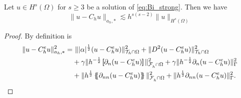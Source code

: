 \begin{lemma}
    \label{lemma:astar_estimate}
    Let $u \in H^{s}( \Omega ) $ for $s\ge 3$ be a solution of \eqref{eq:Bi_strong}. Then we have  \[
    \|  u - C_{h}u \|_{ a_{h},*  }^{  } \lesssim h^{s(s-2)} \| u \|_{ H^{s}( \Omega )  }^{  }
    \]

\end{lemma}
\begin{proof}
    By definition is
    \[
        \begin{split}
            \| u - C_{h}^{e}u \|_{ a_{h}, * }^{  2}  =& \ \| |\alpha |^{\frac{1}{2}} ( u - C_{h}^{e}u) \|_{ \mathcal{T} _{h} \cap \Omega  }^{ 2}  + \| D^2 ( u - C_{h}^{e}u ) \|_{\mathcal{T} _{h} \cap \Omega   }^{ 2 } \\  &  + \gamma \| h^{-\frac{1}{2}} \jump{ \partial _{n} (u -
        C_{h}^{e} u) }   \|_{ \mathcal{F}_{h}^{}\cap \Omega    }^{ 2
        } + \gamma \| h^{-\frac{1}{2}}  \partial _{n} (u - C_{h}^{e}u)    \|_{ \Gamma   }^{ 2 } \\
          & + \| h^{\frac{1}{2}} \mean{ \partial _{nn} (u - C_{h}^{e}u) }   \|_{\mathcal{F} _{h}^{} \cap \Omega   }^{  2} +  \| h^{\frac{1}{2}} \partial _{nn}(u - C_{h}^{e}u)     \|_{ \Gamma }^{  2}.
        \end{split}
    \]


\end{proof}
